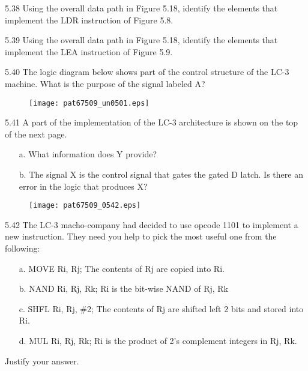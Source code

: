 \documentclass{patt}
\begin{document}
\begin{exercises}
\item[5.38] Using the overall data path in Figure 5.18, identify the
  elements that implement the LDR instruction of Figure 5.8.

\item[5.39] Using the overall data path in Figure 5.18, identify the
  elements that implement the LEA instruction of Figure 5.9.

\item[5.40] The logic diagram below shows part of the control
  structure of the LC-3 machine. What is the purpose of the signal
  labeled A?

\begin{figure}[!h]
\centerline{\texttt{[image: pat67509\_un0501.eps]}}
\end{figure}

\enlargethispage{-2\baselineskip}

\item[5.41] A part of the implementation of the LC-3 architecture is
  shown on the top of the next page.
\begin{enumerate}
\item[a.] What information does Y provide?
\item[b.] The signal X is the control signal that gates the gated D
  latch. Is there an error in the logic that produces X?
\end{enumerate}

\newpage

\begin{figure}[!h]
\centerline{\texttt{[image: pat67509\_0542.eps]}}
\end{figure}

\item[5.42] The LC-3 macho-company had decided to use opcode 1101 to
  implement a new instruction. They need you help to pick the most
  useful one from the following:
  \begin{enumerate}[a.]
  \item[a.] MOVE Ri, Rj; The contents of Rj are copied into Ri.
  \item[b.] NAND Ri, Rj, Rk; Ri is the bit-wise NAND of Rj, Rk
  \item[c.] SHFL Ri, Rj, \#2; The contents of Rj are shifted left 2 bits
  and stored into Ri.
  \item[d.] MUL Ri, Rj, Rk; Ri is the product of 2's complement integers\break
    in Rj, Rk.
  \end{enumerate}
  \noindent
  Justify your answer.


\end{exercises}
\end{document}

